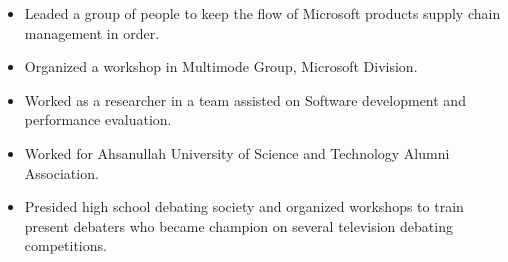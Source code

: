 
\begin{itemize}
\tightlist
\item
	Leaded a group of people to keep the flow of Microsoft products supply chain management in order.
\item
	Organized a workshop in Multimode Group, Microsoft Division.
\item
	Worked as a researcher in a team assisted on Software development and performance evaluation.
\item
	Worked for Ahsanullah University of Science and Technology Alumni Association.
\item
	Presided high school debating society and organized workshops to train present debaters who became champion on several television debating competitions.
\end{itemize}		
